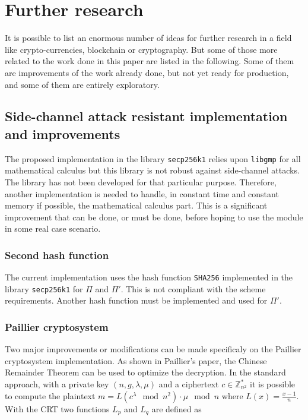 \chapter{Further research}
\label{chap:furtherResearch}

It is possible to list an enormous number of ideas for further research in a field
like crypto-currencies, blockchain or cryptography. But some of those more related to the work
done in this paper are listed in the following. Some of them are improvements of
the work already done, but not yet ready for production, and some of them are
entirely exploratory.

\section{Side-channel attack resistant implementation and improvements}

The proposed implementation in the library \texttt{secp256k1} relies upon
\texttt{libgmp} for all mathematical calculus but this library is
not robust against side-channel attacks. The library has not
been developed for that particular purpose. Therefore, another implementation
is needed to handle, in constant time and constant memory if
possible, the mathematical calculus part. This is a significant improvement that
can be done, or must be done, before hoping to use the module in some real case
scenario.

\subsection{Second hash function}

The current implementation uses the hash function \texttt{SHA256} implemented
in the library \texttt{secp256k1} for $\Pi$ and $\Pi'$. This is not compliant
with the scheme requirements. Another hash function must be implemented
and used for $\Pi'$.

\subsection{Paillier cryptosystem}

Two major improvements or modifications can be made specificaly on the
Paillier cryptosystem implementation. As shown in Paillier's paper, the
Chinese Remainder Theorem can be used to optimize the decryption. In the
standard approach, with a private key $(n, g, \lambda, \mu)$ and a ciphertext $c
\in \mathbb{Z}_{n^2}^*$ it is possible to compute the plaintext $m =
L(c^{\lambda} \mod n^2) \cdot \mu \mod n$ where $L(x) = \frac{x-1}{n}$. With the
CRT two functions $L_p$ and $L_q$ are defined as

